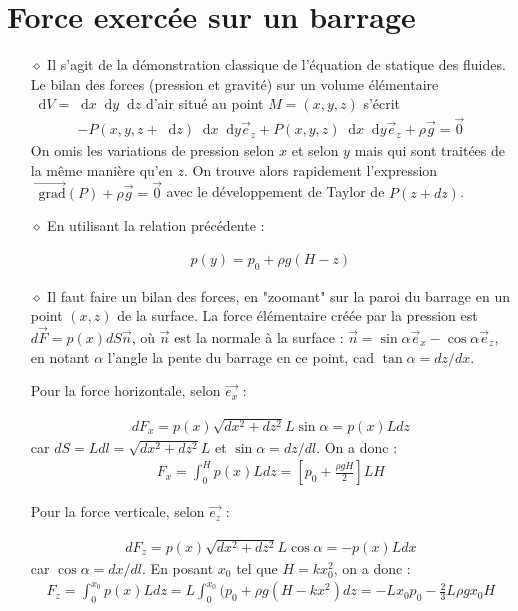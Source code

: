 \documentclass{report}
\newcommand*\dif{\mathop{}\!\mathrm{d}}
\newcommand*\grad{\mathop{}\!\mathrm{grad}}
\begin{document}
\section*{Force exercée sur un barrage}

\begin{itemize}

	\item[$\diamond$] Il s'agit de la démonstration classique de l'équation de statique des fluides. Le bilan des forces (pression et gravité) sur un volume élémentaire $\dif V=\dif x \dif y \dif z$ d'air situé au point $M=(x,y,z)$ s'écrit
	\begin{align*}
		-P(x,y,z+ \dif z)\dif x\dif y\vec{e}_z+P(x,y,z)\dif x\dif y\vec{e}_z+\rho\vec{g}=\vec{0}
	\end{align*}
	On omis les variations de pression selon $x$ et selon $y$ mais qui sont traitées de la même manière qu'en $z$. On trouve alors rapidement l'expression $\vec{\grad}(P) + \rho\vec{g}=\vec{0}$ avec le développement de Taylor de $P(z+dz)$.
	
	\item[$\diamond$] En utilisant la relation précédente : 
	
	\begin{align*}
		p(y) = p_0+\rho g (H-z)
	\end{align*}
		
		\item[$\diamond$] Il faut faire un bilan des forces, en "zoomant" sur la paroi du barrage en un point $(x,z)$ de la surface. La force élémentaire créée par la pression est $d\vec{F}=p(x)dS\vec{n}$, où $\vec{n}$ est la normale à la surface : $\vec{n}=\sin\alpha\vec{e}_x-\cos\alpha\vec{e}_z$, en notant $\alpha$ l'angle la pente du barrage en ce point, cad $\tan\alpha=dz/dx$.
		
		Pour la force horizontale, selon $\vec{e_x}$ :
		
	\begin{align*}
		dF_x = p(x)\sqrt{dx^2+dz^2}L\sin\alpha=p(x)Ldz
	\end{align*}
	car $dS = Ldl=\sqrt{dx^2+dz^2}L$ et $\sin\alpha=dz/dl$. On a donc :
	\begin{align*}
		F_x = \int_0^H p(x)Ldz=\left[  p_0+\frac{\rho g H}{2}\right] LH
	\end{align*}
	
		Pour la force verticale, selon $\vec{e_z}$ :
		
	\begin{align*}
		dF_z= p(x)\sqrt{dx^2+dz^2}L\cos\alpha = -p(x)Ldx
	\end{align*}
	car $\cos\alpha=dx/dl$. En posant $x_0$ tel que $H=kx_0^2$, on a donc :
	\begin{align*}
		F_z = \int_0^{x_0} p(x)Ldz=L\int_0^{x_0} (p_0+\rho g (H-kx^2)dz=-Lx_0p_0-\frac{2}{3}L\rho g x_0H
	\end{align*}

\end{itemize}
\end{document}
